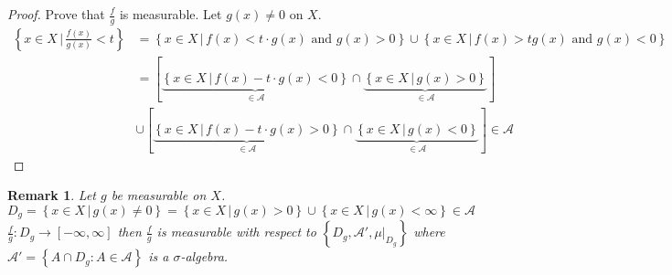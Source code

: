\documentclass{article}
\newtheorem{remark}{Remark}  \numberwithin{remark}{section}
\newcommand{\set}[1]{\left\{#1\right\}}
\newcommand{\setdef}[2]{\left\{\left.#1\,\right|\,#2\right\}}
\begin{document}
\begin{proof}
  Prove that $\frac fg$ is measurable. Let $g(x) \neq 0$ on $X$.
  \begin{align*}
    \setdef{x \in X}{\frac{f(x)}{g(x)} < t}
    	&= \setdef{x \in X}{f(x) < t \cdot g(x) \text{ and } g(x) > 0}
    	\cup \setdef{x \in X}{f(x) > t g(x) \text{ and } g(x) < 0} \\
    	&= \left[\underbrace{\setdef{x \in X}{f(x) - t \cdot g(x) < 0}}_{\in \mathcal A} \cap \underbrace{\setdef{x \in X}{g(x) > 0}}_{\in \mathcal A}\right] \\
    	&\cup \left[\underbrace{\setdef{x \in X}{f(x) - t \cdot g(x) > 0}}_{\in \mathcal A} \cap \underbrace{\setdef{x \in X}{g(x) < 0}}_{\in \mathcal A}\right] \in \mathcal A
  \end{align*}
\end{proof}

\begin{remark}
  Let $g$ be measurable on $X$.
  \[ D_g = \setdef{x \in X}{g(x) \neq 0} = \setdef{x \in X}{g(x) > 0} \cup \setdef{x \in X}{g(x) < \infty} \in \mathcal A \]
  $\frac fg: D_g \to [-\infty, \infty]$ then $\frac fg$ is measurable with respect to $\set{D_g, \mathcal A', \left.\mu\right|_{D_g}}$
  where $\mathcal A' = \set{A \cap D_g: A \in \mathcal A}$ is a $\sigma$-algebra.
\end{remark}
\end{document}
